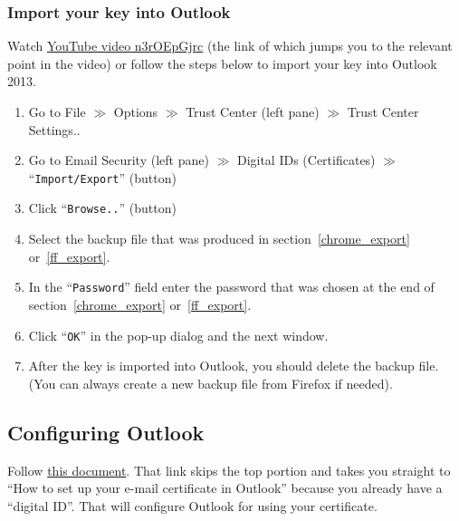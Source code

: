 \documentclass[pdftex,12pt,titlepage=false]{scrartcl}
\begin{document}
\subsubsection{Import your key into Outlook}\label{import}
Watch
\href{https://www.youtube.com/watch?v=n3rOEpGjrc\&start=390}{YouTube
  video n3rOEpGjrc} (the link of which jumps you to the relevant
point in the video)
or follow the steps below to import your key into Outlook 2013.
\begin{enumerate}
\item Go to File $\gg$ Options $\gg$ Trust Center (left pane) $\gg$ Trust Center Settings..
\item Go to Email Security (left pane) $\gg$ Digital IDs (Certificates) $\gg$ ``\texttt{Import/Export}'' (button)
\item Click ``\texttt{Browse..}'' (button)
\item Select the backup file that was produced in section~\ref{chrome_export} or~\ref{ff_export}.
\item In the ``\texttt{Password}'' field enter the password that was chosen at the end of section~\ref{chrome_export} or~\ref{ff_export}.
\item Click ``\texttt{OK}'' in the pop-up dialog and the next window.
\item After the key is imported into Outlook, you should delete the
  backup file.  (You can always create a new backup file from Firefox
  if needed).
\end{enumerate}

\subsection{Configuring Outlook}\label{outlookcfg}
Follow
\href{https://www.ablebits.com/office-addins-blog/2014/04/11/email-encryption-outlook/#setup-email-certificate}{this
  document}.  That link skips the top portion and takes you straight
to ``How to set up your e-mail certificate in Outlook'' because you
already have a ``digital ID''.  That will configure Outlook for using
your certificate.
\end{document}
